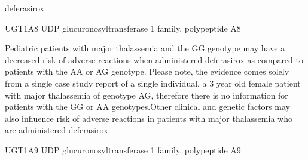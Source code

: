 \documentclass{resume} %
\begin{document}
\begin{rSection}{ deferasirox }
\begin{rSubsection}{ UGT1A8 }{ UDP glucuronosyltransferase 1 family, polypeptide A8 }{}{}
\item[] Pediatric patients with major thalassemia and the GG genotype may have a decreased risk of adverse reactions when administered deferasirox as compared to patients with the AA or AG genotype. Please note, the evidence comes solely from a single case study report of a single individual, a 3 year old female patient with major thalassemia of genotype AG, therefore there is no information for patients with the GG or AA genotypes.Other clinical and genetic factors may also influence risk of adverse reactions in patients with major thalassemia who are administered deferasirox.
\end{rSubsection}\begin{rSubsection}{ UGT1A9 }{ UDP glucuronosyltransferase 1 family, polypeptide A9 }{}{}
\item[]


\end{rSubsection}
\end{rSection}
\end{document}
